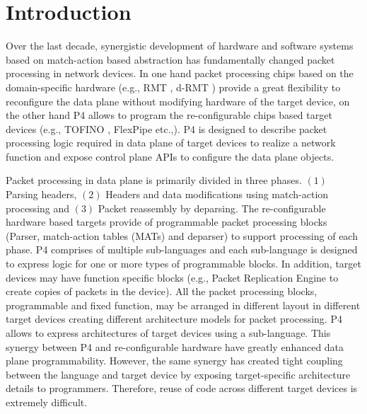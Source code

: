 \section{Introduction}
Over the last decade, synergistic development of hardware and software systems based on match-action based abstraction has fundamentally changed packet processing in network devices.
In one hand packet processing chips based on the domain-specific hardware (e.g., RMT \cite{Bosshart:2013:FMF:2486001.2486011}, d-RMT \cite{Chole:2017:DDP:3098822.3098823}) provide a  great flexibility to reconfigure the data plane without modifying hardware of the target device, on the other hand P4 \cite{Bosshart:2014:PPP:2656877.2656890, p4lang} allows to program the re-configurable chips based target devices (e.g., TOFINO \cite{tofino}, FlexPipe etc.,).
P4 is designed to describe packet processing logic required in data plane of target devices to realize a network function and expose control plane APIs to configure the data plane objects.

Packet processing in data plane is primarily divided in three phases. $(1)$ Parsing headers, $(2)$ Headers and data modifications using match-action processing and $(3)$ Packet reassembly by deparsing.
The re-configurable hardware based targets provide of programmable packet processing blocks (Parser, match-action tables (MATs) and deparser) to support processing of each phase. 
P4 comprises of multiple sub-languages and each sub-language is designed to express logic for one or more types of programmable blocks. 
In addition, target devices may have function specific blocks (e.g., Packet Replication Engine to create copies of packets in the device).
All the packet processing blocks, programmable and fixed function, may be arranged in different layout in different target devices creating different architecture models for packet processing.
P4 allows to express architectures of target devices using a sub-language.
This synergy between P4 and re-configurable hardware have greatly enhanced data plane programmability. 
However, the same synergy has created tight coupling between the language and target device by exposing target-specific architecture details to programmers.
Therefore, reuse of code across different target devices is extremely difficult.


